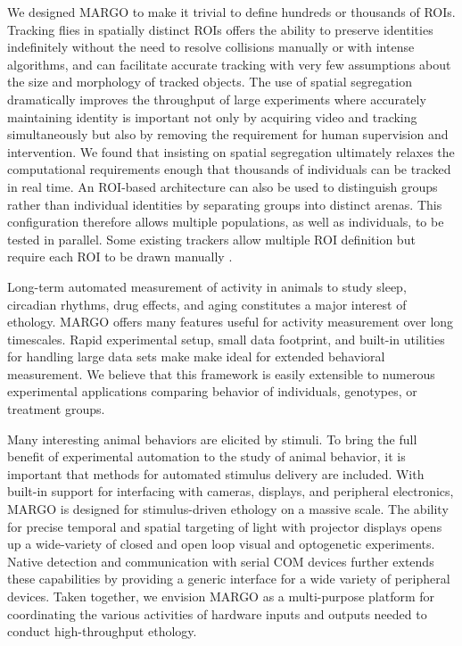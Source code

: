 \documentclass[10pt]{article}
\begin{document}
\begin{multicols}{2}
We designed MARGO to make it trivial to define hundreds or thousands of ROIs. Tracking flies in spatially distinct ROIs offers the ability to preserve identities indefinitely without the need to resolve collisions manually or with intense algorithms, and can facilitate accurate tracking with very few assumptions about the size and morphology of tracked objects. The use of spatial segregation dramatically improves the throughput of large experiments where accurately maintaining identity is important not only by acquiring video and tracking simultaneously but also by removing the requirement for human supervision and intervention. We found that insisting on spatial segregation ultimately relaxes the computational requirements enough that thousands of individuals can be tracked in real time. An ROI-based architecture can also be used to distinguish groups rather than individual identities by separating groups into distinct arenas. This configuration therefore allows multiple populations, as well as individuals, to be tested in parallel. Some existing trackers allow multiple ROI definition but require each ROI to be drawn manually \cite{Prez-Escudero_idTracker_2014,Mnck_BioTracker_2018}.

Long-term automated measurement of activity in animals to study sleep, circadian rhythms, drug effects, and aging constitutes a major interest of ethology. MARGO offers many features useful for activity measurement over long timescales. Rapid experimental setup, small data footprint, and built-in utilities for handling large data sets make make ideal for extended behavioral measurement. We believe that this framework is easily extensible to numerous experimental applications comparing behavior of individuals, genotypes, or treatment groups.  

Many interesting animal behaviors are elicited by stimuli. To bring the full benefit of experimental automation to the study of animal behavior, it is important that methods for automated stimulus delivery are included. With built-in support for interfacing with cameras, displays, and peripheral electronics, MARGO is designed for stimulus-driven ethology on a massive scale. The ability for precise temporal and spatial targeting of light with projector displays opens up a wide-variety of closed and open loop visual and optogenetic experiments. Native detection and communication with serial COM devices further extends these capabilities by providing a generic interface for a wide variety of peripheral devices. Taken together, we envision MARGO as a multi-purpose platform for coordinating the various activities of hardware inputs and outputs needed to conduct high-throughput ethology. 


\end{multicols}
\end{document}
